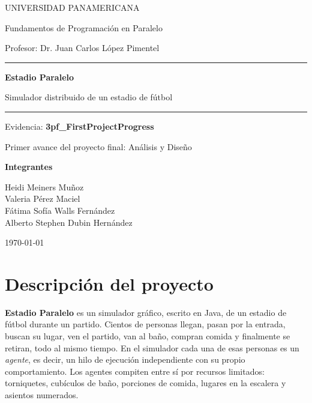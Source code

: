 \documentclass[11pt,letterpaper]{article}
\newcommand{\proyecto}{Estadio Paralelo}
\begin{document}
\begin{titlepage}
  \centering
  {\Large UNIVERSIDAD PANAMERICANA\par}
  \vspace{1.2cm}
  {\large Fundamentos de Programación en Paralelo\par}
  \vspace{0.3cm}
  {\large Profesor: Dr. Juan Carlos López Pimentel\par}
  \vspace{2.5cm}
  {\color{acento}\rule{\linewidth}{1pt}\par}
  \vspace{0.4cm}
  {\Huge\bfseries \proyecto\par}
  \vspace{0.3cm}
  {\Large Simulador distribuido de un estadio de fútbol\par}
  \vspace{0.4cm}
  {\color{acento}\rule{\linewidth}{1pt}\par}
  \vspace{1.5cm}
  {\large Evidencia: \textbf{3pf\_FirstProjectProgress}\par}
  {\large Primer avance del proyecto final: Análisis y Diseño\par}
  \vfill
  {\large\bfseries Integrantes\par}
  \vspace{0.3cm}
  {\large Heidi Meiners Muñoz \\ Valeria Pérez Maciel \\ Fátima Sofía Walls Fernández \\ Alberto Stephen Dubin Hernández\par}
  \vspace{1.5cm}
  {\large \today\par}
\end{titlepage}

\tableofcontents
\newpage

\section{Descripción del proyecto}

\textbf{\proyecto} es un simulador gráfico, escrito en Java, de un estadio de fútbol durante un partido. Cientos de personas llegan, pasan por la entrada, buscan su lugar, ven el partido, van al baño, compran comida y finalmente se retiran, todo al mismo tiempo. En el simulador cada una de esas personas es un \emph{agente}, es decir, un hilo de ejecución independiente con su propio comportamiento. Los agentes compiten entre sí por recursos limitados: torniquetes, cubículos de baño, porciones de comida, lugares en la escalera y asientos numerados.
\end{document}
